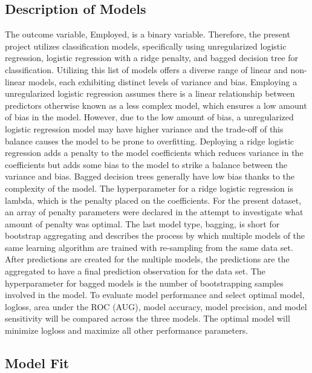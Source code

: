\documentclass[
  man]{apa6}
\begin{document}
\hypertarget{description-of-models}{%
\subsection{Description of Models}\label{description-of-models}}

The outcome variable, Employed, is a binary variable. Therefore, the present project utilizes classification models, specifically using unregularized logistic regression, logistic regression with a ridge penalty, and bagged decision tree for classification. Utilizing this list of models offers a diverse range of linear and non-linear models, each exhibiting distinct levels of variance and bias.
Employing a unregularized logistic regression assumes there is a linear relationship between predictors otherwise known as a less complex model, which ensures a low amount of bias in the model. However, due to the low amount of bias, a unregularized logistic regression model may have higher variance and the trade-off of this balance causes the model to be prone to overfitting.
Deploying a ridge logistic regression adds a penalty to the model coefficients which reduces variance in the coefficients but adds some bias to the model to strike a balance between the variance and bias. Bagged decision trees generally have low bias thanks to the complexity of the model. The hyperparameter for a ridge logistic regression is lambda, which is the penalty placed on the coefficients. For the present dataset, an array of penalty parameters were declared in the attempt to investigate what amount of penalty was optimal.
The last model type, bagging, is short for bootstrap aggregating and describes the process by which multiple models of the same learning algorithm are trained with re-sampling from the same data set. After predictions are created for the multiple models, the predictions are the aggregated to have a final prediction observation for the data set. The hyperparameter for bagged models is the number of bootstrapping samples involved in the model. To evaluate model performance and select optimal model, logloss, area under the ROC (AUG), model accuracy, model precision, and model sensitivity will be compared across the three models. The optimal model will minimize logloss and maximize all other performance parameters.

\hypertarget{model-fit}{%
\subsection{Model Fit}\label{model-fit}}
\end{document}
